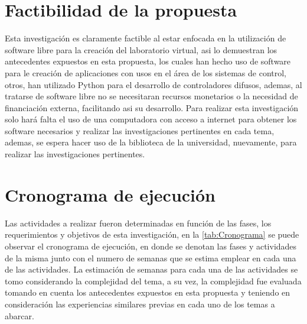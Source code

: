 \section{Factibilidad de la propuesta}

    Esta investigación es claramente factible al estar enfocada en la utilización de software libre para la creación del laboratorio virtual, asi lo demuestran los antecedentes expuestos en esta propuesta, los cuales han hecho uso de software para le creación de aplicaciones con usos en el área de los sistemas de control, otros, han utilizado Python para el desarrollo de controladores difusos, ademas, al tratarse de software libre no se necesitaran recursos monetarios o la necesidad de financiación externa, facilitando asi su desarrollo. Para realizar esta investigación solo hará falta el uso de una computadora con acceso a internet para obtener los software necesarios y realizar las investigaciones pertinentes en cada tema, ademas, se espera hacer uso de la biblioteca de la universidad, nuevamente, para realizar las investigaciones pertinentes.

\section{Cronograma de ejecución}

    Las actividades a realizar fueron determinadas en función de las fases, los requerimientos y objetivos de esta investigación, en la \cref{tab:Cronograma} se puede observar el cronograma de ejecución, en donde se denotan las fases y actividades de la misma junto con el numero de semanas que se estima emplear en cada una de las actividades. La estimación de semanas para cada una de las actividades se tomo considerando la complejidad del tema, a su vez, la complejidad fue evaluada tomando en cuenta los antecedentes expuestos en esta propuesta y teniendo en consideración las experiencias similares previas en cada uno de los temas a abarcar.

